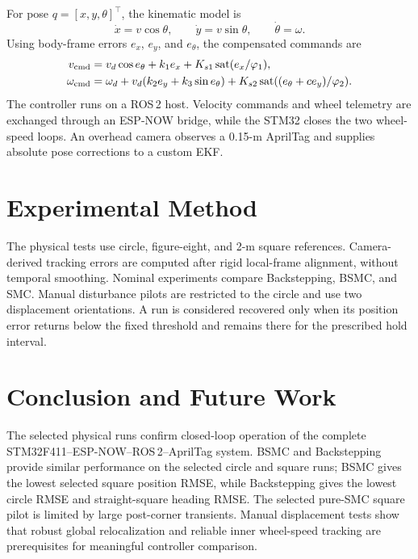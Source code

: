 \documentclass[conference]{IEEEtran}
\begin{document}
For pose $q=[x,y,\theta]^\top$, the kinematic model is
\begin{equation}
  \dot{x}=v\cos\theta,\qquad
  \dot{y}=v\sin\theta,\qquad
  \dot{\theta}=\omega .
\end{equation}
Using body-frame errors $e_x$, $e_y$, and $e_\theta$, the compensated
commands are
\begin{align}
  v_{\rm cmd} &=
    v_d\cos e_\theta+k_1e_x+
    K_{s1}\operatorname{sat}(e_x/\varphi_1),\\
  \omega_{\rm cmd} &=
    \omega_d+v_d(k_2e_y+k_3\sin e_\theta)+
    K_{s2}\operatorname{sat}((e_\theta+ce_y)/\varphi_2).
\end{align}
The controller runs on a ROS\,2 host. Velocity commands and wheel telemetry
are exchanged through an ESP-NOW bridge, while the STM32 closes the two
wheel-speed loops. An overhead camera observes a 0.15-m AprilTag and supplies
absolute pose corrections to a custom EKF.

\section{Experimental Method}

The physical tests use circle, figure-eight, and 2-m square references.
Camera-derived tracking errors are computed after rigid local-frame
alignment, without temporal smoothing. Nominal experiments compare
Backstepping, BSMC, and SMC. Manual disturbance pilots are restricted to the
circle and use two displacement orientations. A run is considered recovered
only when its position error returns below the fixed threshold and remains
there for the prescribed hold interval.



\section{Conclusion and Future Work}

The selected physical runs confirm closed-loop operation of the complete
STM32F411--ESP-NOW--ROS\,2--AprilTag system. BSMC and Backstepping provide
similar performance on the selected circle and square runs; BSMC gives the
lowest selected square position RMSE, while Backstepping gives the lowest
circle RMSE and straight-square heading RMSE. The selected pure-SMC square
pilot is limited by large post-corner transients. Manual displacement tests
show that robust global relocalization and reliable inner wheel-speed
tracking are prerequisites for meaningful controller comparison.
\end{document}
